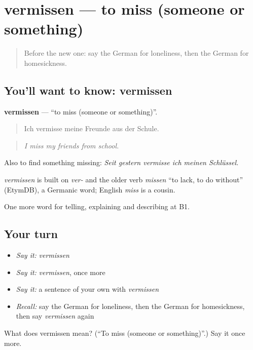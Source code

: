 \section[vermissen]{vermissen — to miss (someone or something)}

\label{lesson:GE-C472-vermissen}



\begin{quote}
Before the new one: say the German for loneliness, then the German for homesickness.
\end{quote}

\subsection*{You'll want to know: vermissen}
\textbf{vermissen} — \textquotedblleft{}to miss (someone or something)\textquotedblright{}.

\begin{quote}
Ich vermisse meine Freunde aus der Schule.
\end{quote}

\begin{quote}
\emph{I miss my friends from school.}
\end{quote}

Also to find something missing: \emph{Seit gestern vermisse ich meinen Schlüssel.}

\begin{cousinweb}
\emph{vermissen} is built on \emph{ver-} and the older verb \emph{missen} \textquotedblleft{}to lack, to do without\textquotedblright{} (EtymDB), a Germanic word; English \emph{miss} is a cousin.
\end{cousinweb}

\begin{grammarlens}[title={What you've built}]
One more word for telling, explaining and describing at B1.
\end{grammarlens}

\subsection*{Your turn}
\begin{itemize}
\raggedright
  \item \emph{Say it:} \emph{vermissen}
  \item \emph{Say it:} \emph{vermissen}, once more
  \item \emph{Say it:} a sentence of your own with \emph{vermissen}
  \item \emph{Recall:} say the German for loneliness, then the German for homesickness, then say \emph{vermissen} again
\end{itemize}

\begin{tcolorbox}[breakable,colback=teal!4,colframe=teal!35!black,title={Before you move on}]
What does vermissen mean? (\textquotedblleft{}To miss (someone or something)\textquotedblright{}.) Say it once more.
\end{tcolorbox}
